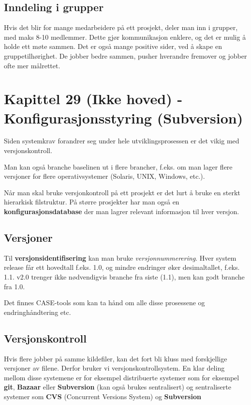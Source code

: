 \documentclass[11pt]{article}
\begin{document}
\subsection{Inndeling i grupper}
\label{sec-15.4}

   Hvis det blir for mange medarbeidere på ett prosjekt, deler man inn i grupper, 
   med maks 8-10 medlemmer. Dette gjør kommunikasjon enklere, og det er mulig å 
   holde ett møte sammen. Det er også mange positive sider, ved å skape en gruppetilhørighet. 
   De jobber bedre sammen, pusher hverandre fremover og jobber ofte mer målrettet.
\section{Kapittel 29 (Ikke hoved) - Konfigurasjonsstyring (Subversion)}
\label{sec-16}

  Siden systemkrav forandrer seg under hele utviklingsprosessen er det vikig med versjonskontroll. 
  
  Man kan også branche baselinen ut i flere brancher, f.eks. om man lager flere versjoner for 
  flere operativsystemer (Solaris, UNIX, Windows, etc.). 
  
  Når man skal bruke versjonkontroll på ett prosjekt er det lurt å bruke en sterkt 
  hierarkisk filstruktur. På større prosjekter har man også en \textbf{konfigurasjonsdatabase}
  der man lagrer relevant informasjon til hver versjon.
\subsection{Versjoner}
\label{sec-16.1}


  Til \textbf{versjonsidentifisering} kan man bruke \emph{versjonnummerering}. Hver system release 
  får ett hovedtall f.eks. 1.0, og mindre endringer øker desimaltallet, f.eks. 1.1. v2.0 
  trenger ikke nødvendigvis branche fra siste (1.1), men kan godt branche fra 1.0.
   
  Det finnes CASE-tools som kan ta hånd om alle disse prosessene og endringhåndtering etc.
\subsection{Versjonskontroll}
\label{sec-16.2}

   Hvis flere jobber på samme kildefiler, kan det fort bli kluss med forskjellige versjoner av filene. 
   Derfor bruker vi versjonskontrollsystem.
   En klar deling mellom disse systemene er for eksempel distribuerte systemer
   som for eksempel \textbf{git}, \textbf{Bazaar} eller \textbf{Subversion} (kan også brukes sentralisert)
   og sentraliserte systemer som \textbf{CVS} (Concurrent Versions System) og \textbf{Subversion}
\end{document}
